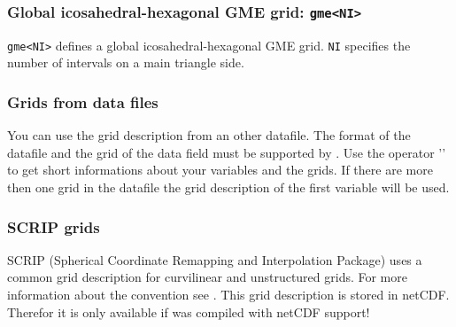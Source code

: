 
\subsubsection*{Global icosahedral-hexagonal GME grid: {\tt gme<NI>}}
    {\tt gme<NI>} defines a global icosahedral-hexagonal GME grid.
    {\tt NI} specifies the number of intervals on a main triangle side.

\subsubsection{Grids from data files}

You can use the grid description from an other datafile.
The format of the datafile and the grid of the data field must be supported by {\CDO} .
Use the operator '' to get short informations about your variables and the grids.
If there are more then one grid in the datafile the grid description of the first variable will be used.

\subsubsection{SCRIP grids}

SCRIP (Spherical Coordinate Remapping and Interpolation Package) uses
a common grid description for curvilinear and unstructured grids.
For more information about the convention see \cite{SCRIP}.
This grid description is stored in netCDF. Therefor it is only
available if {\CDO} was compiled with netCDF support!

\vspace{2mm}

